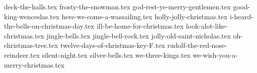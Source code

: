 \documentclass[letterpaper]{article}
\begin{document}

\begin{songs}{}

{deck-the-halls.tex}
{frosty-the-snowman.tex}
{god-rest-ye-merry-gentlemen.tex}
{good-king-wenceslas.tex}
{here-we-come-a-wassailing.tex}
{holly-jolly-christmas.tex}
{i-heard-the-bells-on-christmas-day.tex}
{ill-be-home-for-christmas.tex}
{look-alot-like-christmas.tex}
{jingle-bells.tex}
{jingle-bell-rock.tex}
{jolly-old-saint-nicholas.tex}
{oh-christmas-tree.tex}
{twelve-days-of-christmas-key-F.tex}
{rudolf-the-red-nose-reindeer.tex}
{silent-night.tex}
{silver-bells.tex}
{we-three-kings.tex}
{we-wish-you-a-merry-christmas.tex}

\begin{comment}
\end{comment}

\end{songs}
\end{document}
